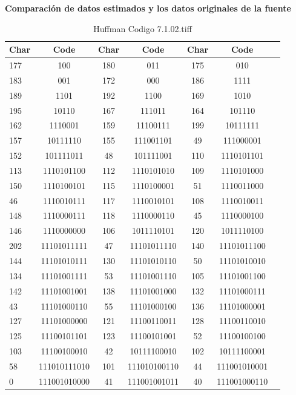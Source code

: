 \documentclass[conference,onecolumn,12pt]{IEEEtran}
\numberwithin{equation}{subsection}
\begin{document}
\textbf{Comparación de datos estimados y los datos originales de la fuente}



\begin{table}[H]
\centering
\caption{Huffman Codigo 7.1.02.tiff}
\label{tab:compression_tiff}
\begin{tabular}{lcccccc}
\hline
\textbf{Char} & \textbf{Code} & \textbf{Char} & \textbf{Code} & \textbf{Char} & \textbf{Code} \\
\hline
177 & 100 & 180 & 011 & 175 & 010 \\
183 & 001 & 172 & 000 & 186 & 1111 \\
189 & 1101 & 192 & 1100 & 169 & 1010 \\
195 & 10110 & 167 & 111011 & 164 & 101110 \\
162 & 1110001 & 159 & 11100111 & 199 & 10111111 \\
157 & 10111110 & 155 & 111001101 & 49 & 111000001 \\
152 & 101111011 & 48 & 101111001 & 110 & 1110101101 \\
113 & 1110101100 & 112 & 1110101010 & 109 & 1110101000 \\
150 & 1110100101 & 115 & 1110100001 & 51 & 1110011000 \\
46 & 1110010111 & 117 & 1110010101 & 108 & 1110010011 \\
148 & 1110000111 & 118 & 1110000110 & 45 & 1110000100 \\
146 & 1110000000 & 106 & 1011110101 & 120 & 1011110100 \\
202 & 11101011111 & 47 & 11101011110 & 140 & 11101011100 \\
144 & 11101010111 & 130 & 11101010110 & 50 & 11101010010 \\
134 & 11101001111 & 53 & 11101001110 & 105 & 11101001100 \\
142 & 11101001001 & 138 & 11101001000 & 132 & 11101000111 \\
43 & 11101000110 & 55 & 11101000100 & 136 & 11101000001 \\
127 & 11101000000 & 121 & 11100110011 & 128 & 11100110010 \\
125 & 11100101101 & 123 & 11100101001 & 52 & 11100100100 \\
103 & 11100100010 & 42 & 10111100010 & 102 & 10111100001 \\
58 & 111010111010 & 101 & 111010100110 & 44 & 111001010001 \\
0 & 111001010000 & 41 & 111001001011 & 40 & 111001000110 \\
\hline
\end{tabular}
\end{table}
\end{document}
